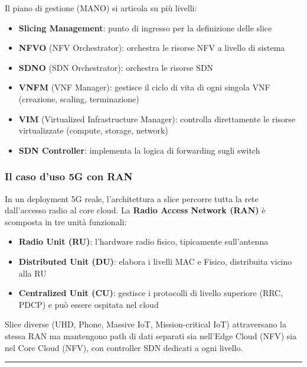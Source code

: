 \documentclass[
  italian,
  openany]{book}
\providecommand{\tightlist}{%
  \setlength{\itemsep}{0pt}\setlength{\parskip}{0pt}}
\begin{document}
Il piano di gestione (MANO) si articola su più livelli:

\begin{itemize}
\tightlist
\item
  \textbf{Slicing Management}: punto di ingresso per la definizione
  delle slice
\item
  \textbf{NFVO} (NFV Orchestrator): orchestra le risorse NFV a livello
  di sistema
\item
  \textbf{SDNO} (SDN Orchestrator): orchestra le risorse SDN
\item
  \textbf{VNFM} (VNF Manager): gestisce il ciclo di vita di ogni singola
  VNF (creazione, scaling, terminazione)
\item
  \textbf{VIM} (Virtualized Infrastructure Manager): controlla
  direttamente le risorse virtualizzate (compute, storage, network)
\item
  \textbf{SDN Controller}: implementa la logica di forwarding sugli
  switch
\end{itemize}

\subsubsection{Il caso d'uso 5G con RAN}\label{il-caso-duso-5g-con-ran}

In un deployment 5G reale, l'architettura a slice percorre tutta la rete
dall'accesso radio al core cloud. La \textbf{Radio Access Network (RAN)}
è scomposta in tre unità funzionali:

\begin{itemize}
\tightlist
\item
  \textbf{Radio Unit (RU)}: l'hardware radio fisico, tipicamente
  sull'antenna
\item
  \textbf{Distributed Unit (DU)}: elabora i livelli MAC e Fisico,
  distribuita vicino alla RU
\item
  \textbf{Centralized Unit (CU)}: gestisce i protocolli di livello
  superiore (RRC, PDCP) e può essere ospitata nel cloud
\end{itemize}

Slice diverse (UHD, Phone, Massive IoT, Mission-critical IoT)
attraversano la stessa RAN ma mantengono path di dati separati sia
nell'Edge Cloud (NFV) sia nel Core Cloud (NFV), con controller SDN
dedicati a ogni livello.

\begin{center}\rule{0.5\linewidth}{0.5pt}\end{center}
\end{document}
